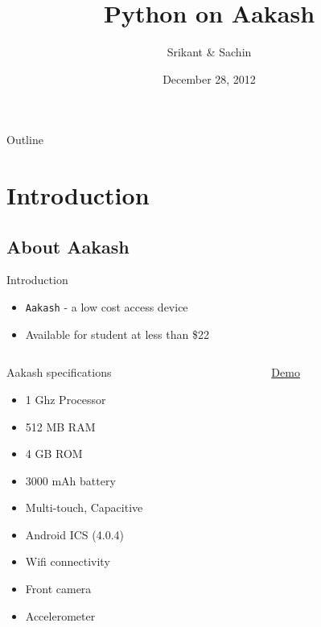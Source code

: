 \documentclass{beamer}
\title[Python on Aakash]{Python on Aakash}
\author{Srikant \& Sachin}
\institute{Indian Institute of Technology, Bombay}
\date{December 28, 2012}
\begin{document}
\begin{frame}
  \titlepage
\end{frame}

\begin{frame}{Outline}
 \tableofcontents
\end{frame}

\section{Introduction}
\subsection{About Aakash}
\begin{frame}{Introduction}
\begin{itemize}
  \item {\tt Aakash} - a low cost access device
  \item Available for student at less than \$22
\end{itemize}
\begin{columns}
\begin{column}{.48\textwidth}
\begin{block}{Aakash specifications}
\begin{itemize}
  \item 1 Ghz Processor
  \item 512 MB RAM
  \item 4 GB ROM
  \item 3000 mAh battery
  \item Multi-touch, Capacitive
  \item Android ICS (4.0.4) 
  \item Wifi connectivity
  \item Front camera
  \item Accelerometer
\end{itemize}
\end{block}
\end{column}%
\begin{column}{.48\textwidth}
  \centerline{\href{file:///home/sachin/Videos/fossin/final.AVI}{Demo}}
\end{column}%
\end{columns}
\end{frame}
\end{document}
